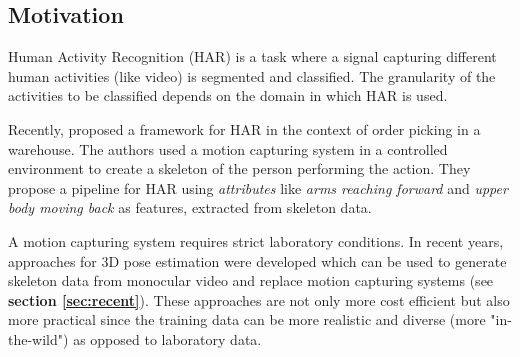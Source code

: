 \documentclass[twoside]{article}
\begin{document}
\begin{multicols}{2} %

\section{Motivation}
\label{sec:motivation}







Human Activity Recognition (HAR) is a task where a signal capturing different human activities (like video) is segmented and classified.
The granularity of the activities to be classified depends on the domain in which HAR is used.

Recently,\cite{reining_towards_2018} proposed a framework for HAR in the context of order picking in a warehouse.
The authors used a motion capturing system in a controlled environment to create a skeleton of the person performing the action.
They propose a pipeline for HAR using \textit{attributes} like \textit{arms reaching forward} and \textit{upper body moving back} as features, extracted from skeleton data.

A motion capturing system requires strict laboratory conditions.
In recent years, approaches for 3D pose estimation were developed which can be used to generate skeleton data from monocular video and replace motion capturing systems (see \textbf{section \ref{sec:recent}}).
These approaches are not only more cost efficient but also more practical since the training data can be more realistic and diverse (more "in-the-wild") as opposed to laboratory data.


\end{multicols}
\end{document}
